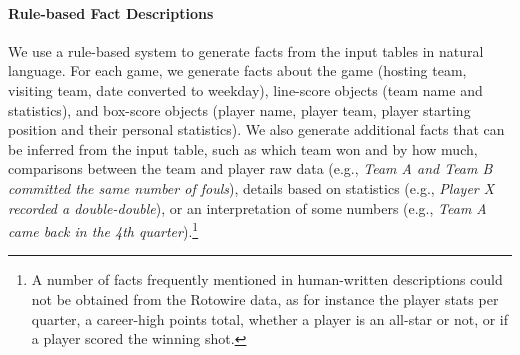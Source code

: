 


\paragraph{Rule-based Fact Descriptions}
We use a rule-based system to generate facts from the input tables in natural language. For each game, we generate facts about the game (hosting team, visiting team, date converted to weekday), line-score objects (team name and statistics), and box-score objects (player name, player team, player starting position and their personal statistics). We also generate additional facts that can be inferred from the input table, such as which team won and by how much, comparisons between the team and player raw data (e.g., \emph{Team A and Team B committed the same number of fouls}), details based on statistics (e.g., \emph{Player X recorded a double-double}), or an interpretation of some numbers (e.g., \emph{Team A came back in the 4th quarter}).\footnote{A number of facts frequently mentioned in human-written descriptions could not be obtained from the Rotowire data, as for instance the player stats per quarter, a career-high points total, whether a player is an all-star or not, or if a player scored the winning shot.}

